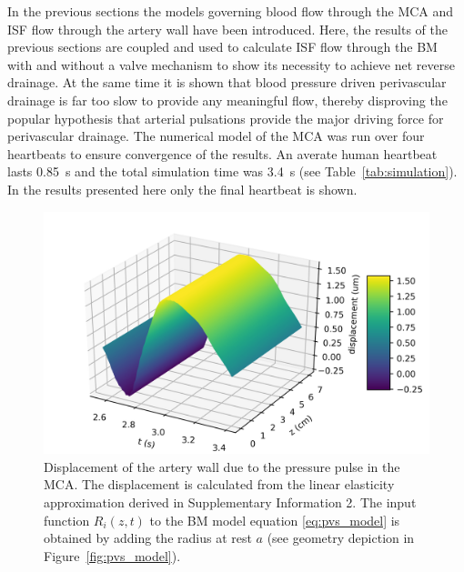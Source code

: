 \documentclass[a4paper,titlepage]{scrartcl}
\begin{document}
In the previous sections the models governing blood flow through the MCA and ISF flow through the artery wall have been introduced. Here, the results of the previous sections are coupled and used to calculate ISF flow through the BM with and without a valve mechanism to show its necessity to achieve net reverse drainage. At the same time it is shown that blood pressure driven perivascular drainage is far too slow to provide any meaningful flow, thereby disproving the popular hypothesis that arterial pulsations provide the major driving force for perivascular drainage. The numerical model of the MCA was run over four heartbeats to ensure convergence of the results. An averate human heartbeat lasts \SI{0.85}{\second} and the total simulation time was \SI{3.4}{\second} (see Table~\ref{tab:simulation}). In the results presented here only the final heartbeat is shown.

\begin{figure}
\centerline{\includegraphics{figures/Ri.png}}
\caption{Displacement of the artery wall due to the pressure pulse in the MCA. The displacement is calculated from the linear elasticity approximation derived in Supplementary Information 2. The input function $R_i(z,t)$ to the BM model equation \eqref{eq:pvs_model} is obtained by adding the radius at rest $a$ (see geometry depiction in Figure~\ref{fig:pvs_model}).\label{fig:ri}}
\end{figure}
\end{document}
